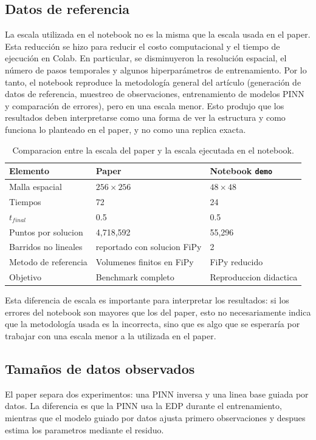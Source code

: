 \documentclass[10pt,letterpaper,twocolumn]{article}
\begin{document}
\subsection{Datos de referencia}
La escala utilizada en el notebook no es la misma que la escala usada en el paper. Esta reducción se hizo para reducir el costo computacional y el tiempo de ejecución en Colab. En particular, se disminuyeron la resolución espacial, el número de pasos temporales y algunos hiperparámetros de entrenamiento. Por lo tanto, el notebook reproduce la metodología general del artículo (generación de datos de referencia, muestreo de observaciones, entrenamiento de modelos PINN y comparación de errores), pero en una escala menor. Esto produjo que los resultados deben interpretarse como una forma de ver la estructura y como funciona lo planteado en el paper, y no como una replica exacta.
\begin{table}[H]
\centering
\caption{Comparacion entre la escala del paper y la escala ejecutada en el notebook.}
\begin{tabularx}{\columnwidth}{lXX}
\toprule
Elemento & Paper & Notebook \texttt{demo} \\
\midrule
Malla espacial & $256\times256$ & $48\times48$ \\
Tiempos & 72 & 24 \\
$t_{final}$ & 0.5 & 0.5 \\
Puntos por solucion & 4,718,592 & 55,296 \\
Barridos no lineales & reportado con solucion FiPy & 2 \\
Metodo de referencia & Volumenes finitos en FiPy & FiPy reducido \\
Objetivo & Benchmark completo & Reproduccion didactica \\
\bottomrule
\end{tabularx}
\end{table}

Esta diferencia de escala es importante para interpretar los resultados: si los errores del notebook son mayores que los del paper, esto no necesariamente indica que la metodología usada es la incorrecta, sino que es algo que se esperaría por trabajar con una escala menor a la utilizada en el paper.

\subsection{Tamaños de datos observados}

El paper separa dos experimentos: una PINN inversa y una linea base guiada por datos. La diferencia es que la PINN usa la EDP durante el entrenamiento, mientras que el modelo guiado por datos ajusta primero observaciones y despues estima los parametros mediante el residuo.
\end{document}
